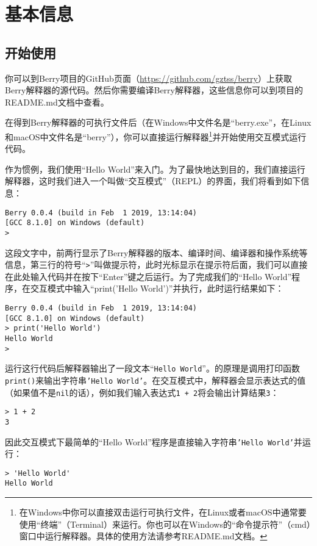 \chapter{基本信息}

\section{开始使用}

你可以到Berry项目的GitHub页面（\url{https://github.com/gztss/berry}）上获取Berry解释器的源代码。然后你需要编译Berry解释器，这些信息你可以到项目的README.md文档中查看。

在得到Berry解释器的可执行文件后（在Windows中文件名是``berry.exe''，在Linux和macOS中文件名是``berry''），你可以直接运行解释器\footnote{在Windows中你可以直接双击运行可执行文件，在Linux或者macOS中通常要使用``终端''（Terminal）来运行。你也可以在Windows的``命令提示符''（cmd）窗口中运行解释器。具体的使用方法请参考README.md文档。}并开始使用交互模式运行代码。

作为惯例，我们使用``Hello World''来入门。为了最快地达到目的，我们直接运行解释器，这时我们进入一个叫做``交互模式''（REPL）的界面，我们将看到如下信息：
\begin{lstlisting}[language=berry, numbers=none]
Berry 0.0.4 (build in Feb  1 2019, 13:14:04)
[GCC 8.1.0] on Windows (default)
>
\end{lstlisting}

这段文字中，前两行显示了Berry解释器的版本、编译时间、编译器和操作系统等信息，第三行的符号``\texttt{>}''叫做提示符，此时光标显示在提示符后面，我们可以直接在此处输入代码并在按下``Enter''键之后运行。为了完成我们的``Hello World''程序，在交互模式中输入``print('Hello World')''并执行，此时运行结果如下：
\begin{lstlisting}[language=berry, numbers=none]
Berry 0.0.4 (build in Feb  1 2019, 13:14:04)
[GCC 8.1.0] on Windows (default)
> print('Hello World')
Hello World
>
\end{lstlisting}

运行这行代码后解释器输出了一段文本``\texttt{Hello World}''。的原理是调用打印函数\texttt{print()}来输出字符串\texttt{'Hello World'}。在交互模式中，解释器会显示表达式的值（如果值不是\texttt{nil}的话），例如我们输入表达式\texttt{1 + 2}将会输出计算结果\texttt{3}：
\begin{lstlisting}[language=berry, numbers=none]
> 1 + 2
3
\end{lstlisting}

因此交互模式下最简单的``Hello World''程序是直接输入字符串\texttt{'Hello World'}并运行：
\begin{lstlisting}[language=berry, numbers=none]
> 'Hello World'
Hello World
\end{lstlisting}

